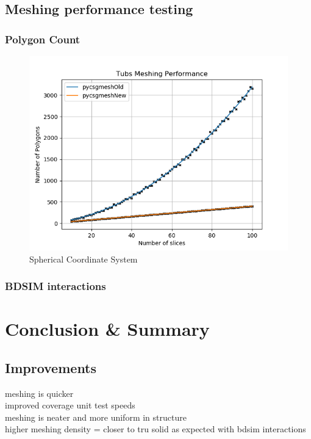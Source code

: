 \documentclass[12pt,a4paper]{article}
\begin{document}
\subsection{Meshing performance testing}
\subsubsection{Polygon Count}

\begin{figure}[h!]
\centering
\includegraphics[scale=0.6]{Images//Quad_fits//Tubs_quad.png}
\caption[width=\columnwidth]{Spherical Coordinate System}
\label{conts}
\end{figure}
\subsubsection{BDSIM interactions}

\newpage
\section{Conclusion \& Summary}
\label{conc}
\subsection{Improvements}
meshing is quicker\\
improved coverage unit test speeds\\
meshing is neater and more uniform in structure\\
higher meshing density = closer to tru solid as expected with bdsim interactions\\
\end{document}
